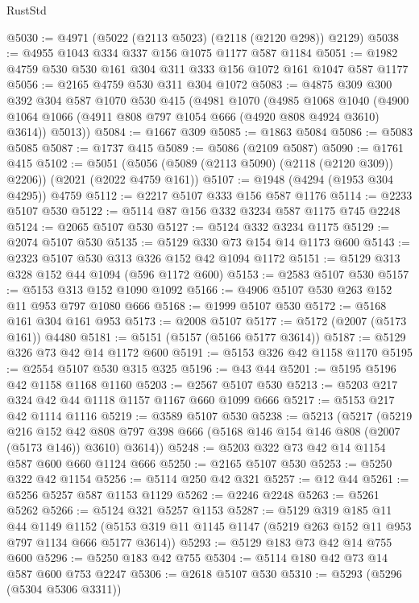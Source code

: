 \begin{lexlean}{RustStd}
\begin{coremodule}
@5030 := @4971 (@5022 (@2113 @5023) (@2118 (@2120 @298)) @2129)
@5038 := @4955 @1043 @334 @337 @156 @1075 @1177 @587 @1184
@5051 := @1982 @4759 @530 @530 @161 @304 @311 @333 @156 @1072 @161 @1047 @587 @1177
@5056 := @2165 @4759 @530 @311 @304 @1072
@5083 := @4875
    @309
    @300
    @392
    @304
    @587
    @1070
    @530
    @415
    (@4981
      @1070
      (@4985
        @1068
        @1040
        (@4900 @1064 @1066 (@4911 @808 @797 @1054 @666 (@4920 @808 @4924 @3610) @3614))
        @5013))
@5084 := @1667 @309
@5085 := @1863 @5084
@5086 := @5083 @5085
@5087 := @1737 @415
@5089 := @5086 (@2109 @5087)
@5090 := @1761 @415
@5102 := @5051 (@5056 (@5089 (@2113 @5090) (@2118 (@2120 @309)) @2206)) (@2021 (@2022 @4759 @161))
@5107 := @1948 (@4294 (@1953 @304 @4295)) @4759
@5112 := @2217 @5107 @333 @156 @587 @1176
@5114 := @2233 @5107 @530
@5122 := @5114 @87 @156 @332 @3234 @587 @1175 @745 @2248
@5124 := @2065 @5107 @530
@5127 := @5124 @332 @3234 @1175
@5129 := @2074 @5107 @530
@5135 := @5129 @330 @73 @154 @14 @1173 @600
@5143 := @2323 @5107 @530 @313 @326 @152 @42 @1094 @1172
@5151 := @5129 @313 @328 @152 @44 @1094 (@596 @1172 @600)
@5153 := @2583 @5107 @530
@5157 := @5153 @313 @152 @1090 @1092
@5166 := @4906 @5107 @530 @263 @152 @11 @953 @797 @1080 @666
@5168 := @1999 @5107 @530
@5172 := @5168 @161 @304 @161 @953
@5173 := @2008 @5107
@5177 := @5172 (@2007 (@5173 @161)) @4480
@5181 := @5151 (@5157 (@5166 @5177 @3614))
@5187 := @5129 @326 @73 @42 @14 @1172 @600
@5191 := @5153 @326 @42 @1158 @1170
@5195 := @2554 @5107 @530 @315 @325
@5196 := @43 @44
@5201 := @5195 @5196 @42 @1158 @1168 @1160
@5203 := @2567 @5107 @530
@5213 := @5203 @217 @324 @42 @44 @1118 @1157 @1167 @660 @1099 @666
@5217 := @5153 @217 @42 @1114 @1116
@5219 := @3589 @5107 @530
@5238 := @5213
    (@5217
      (@5219
        @216
        @152
        @42
        @808
        @797
        @398
        @666
        (@5168 @146 @154 @146 @808 (@2007 (@5173 @146)) @3610)
        @3614))
@5248 := @5203 @322 @73 @42 @14 @1154 @587 @600 @660 @1124 @666
@5250 := @2165 @5107 @530
@5253 := @5250 @322 @42 @1154
@5256 := @5114 @250 @42 @321
@5257 := @12 @44
@5261 := @5256 @5257 @587 @1153 @1129
@5262 := @2246 @2248
@5263 := @5261 @5262
@5266 := @5124 @321 @5257 @1153
@5287 := @5129
    @319
    @185
    @11
    @44
    @1149
    @1152
    (@5153 @319 @11 @1145 @1147 (@5219 @263 @152 @11 @953 @797 @1134 @666 @5177 @3614))
@5293 := @5129 @183 @73 @42 @14 @755 @600
@5296 := @5250 @183 @42 @755
@5304 := @5114 @180 @42 @73 @14 @587 @600 @753 @2247
@5306 := @2618 @5107 @530
@5310 := @5293 (@5296 (@5304 @5306 @3311))

\end{coremodule}
\end{lexlean}
